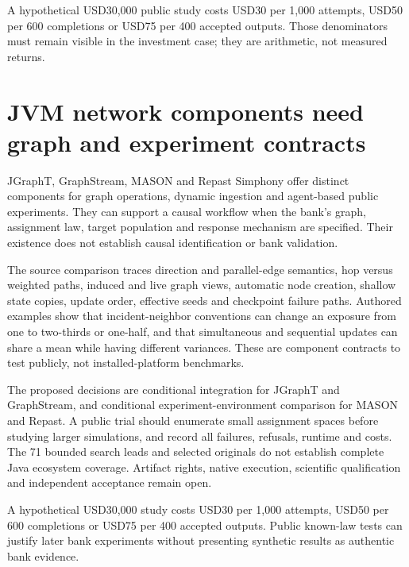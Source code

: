 A hypothetical USD30,000 public study costs USD30 per 1,000 attempts,
USD50 per 600 completions or USD75 per 400 accepted outputs. Those
denominators must remain visible in the investment case; they are
arithmetic, not measured returns. \citep{exec25_pnet_choice}

\hypertarget{jvm-network-components-need-graph-and-experiment-contracts}{%
\section{JVM network components need graph and experiment
contracts}\label{jvm-network-components-need-graph-and-experiment-contracts}}

JGraphT, GraphStream, MASON and Repast Simphony offer distinct
components for graph operations, dynamic ingestion and agent-based
public experiments. They can support a causal workflow when the bank's
graph, assignment law, target population and response mechanism are
specified. Their existence does not establish causal identification or
bank validation.
\citep{exec25_jnet_jgrapht,exec25_jnet_graphstream,exec25_jnet_mason,exec25_jnet_repast}

The source comparison traces direction and parallel-edge semantics, hop
versus weighted paths, induced and live graph views, automatic node
creation, shallow state copies, update order, effective seeds and
checkpoint failure paths. Authored examples show that incident-neighbor
conventions can change an exposure from one to two-thirds or one-half,
and that simultaneous and sequential updates can share a mean while
having different variances. These are component contracts to test
publicly, not installed-platform benchmarks. \citep{exec25_jnet_choice}

The proposed decisions are conditional integration for JGraphT and
GraphStream, and conditional experiment-environment comparison for MASON
and Repast. A public trial should enumerate small assignment spaces
before studying larger simulations, and record all failures, refusals,
runtime and costs. The 71 bounded search leads and selected originals do
not establish complete Java ecosystem coverage. Artifact rights, native
execution, scientific qualification and independent acceptance remain
open. \citep{exec25_jnet_choice}

A hypothetical USD30,000 study costs USD30 per 1,000 attempts, USD50 per
600 completions or USD75 per 400 accepted outputs. Public known-law
tests can justify later bank experiments without presenting synthetic
results as authentic bank evidence. \citep{exec25_jnet_choice}

